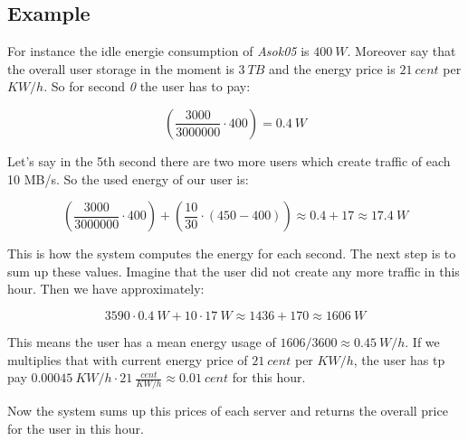   \subsection{Example}
     For instance the idle energie consumption of \textit{Asok05} is $400\ W$. Moreover say that the overall user storage in the moment is $3\ TB$ and the energy price is $21\ cent$ per $KW/h$. So for second \textit{0} the user has to pay:
    
    $$(\frac{3000}{3000000} \cdot 400) = 0.4\ W $$
    
    Let's say in the 5th second there are two more users which create traffic of each 10 MB/s. So the used energy of our user is:
    
     $$(\frac{3000}{3000000} \cdot 400) + (\frac{10}{30} \cdot (450 - 400))  \approx 0.4 + 17 \approx 17.4\ W $$
           
  	This is how the system computes the energy for each second. The next step is to sum up these values. Imagine that the user did not create any more traffic in this hour. Then we have approximately:
  	
  	$$ 3590 \cdot 0.4\ W + 10 \cdot 17\ W \approx 1436 + 170 \approx 1606\ W$$
  	
  	This means the user has a mean energy usage of $1606 / 3600 \approx 0.45\ W/h$. If we multiplies that with current energy price of $21\ cent$ per $KW/h$, the user has tp pay $ 0.00045\ KW/h \cdot 21\ \frac{cent}{KW/h} \approx 0.01\ cent$ for this hour.
  	
  	Now the system sums up this prices of each server and returns the overall price for the user in this hour.  